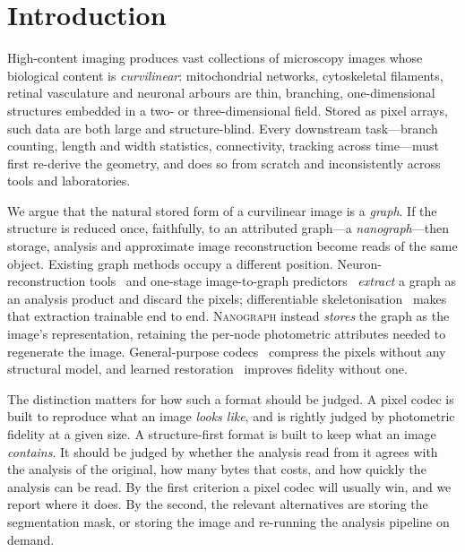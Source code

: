 \documentclass[10pt,a4paper]{article}
\newcommand{\method}{\textnormal{\textsc{Nanograph}}\xspace}
\begin{document}
\section{Introduction}
High-content imaging produces vast collections of microscopy images whose
biological content is \emph{curvilinear}: mitochondrial networks,
cytoskeletal filaments, retinal vasculature and neuronal arbours are thin,
branching, one-dimensional structures embedded in a two- or
three-dimensional field. Stored as pixel arrays, such data are both large
and structure-blind. Every downstream task---branch counting, length and
width statistics, connectivity, tracking across time---must first re-derive
the geometry, and does so from scratch and inconsistently across tools and
laboratories.

We argue that the natural stored form of a curvilinear image is a
\emph{graph}. If the structure is reduced once, faithfully, to an attributed
graph---a \emph{nanograph}---then storage, analysis and approximate image
reconstruction become reads of the same object. Existing graph methods
occupy a different position. Neuron-reconstruction tools~\cite{vaa3d,bigneuron}
and one-stage image-to-graph predictors~\cite{shit2022relationformer,prabhakar2023vesselformer,paetzold2021vesselgraph}
\emph{extract} a graph as an analysis product and discard the pixels;
differentiable skeletonisation~\cite{menten2023skeletonization} makes that
extraction trainable end to end. \method instead \emph{stores} the graph as
the image's representation, retaining the per-node photometric attributes
needed to regenerate the image. General-purpose codecs~\cite{jpeg,webp,skodras2001jpeg2000}
compress the pixels without any structural model, and learned
restoration~\cite{care} improves fidelity without one.

The distinction matters for how such a format should be judged. A pixel
codec is built to reproduce what an image \emph{looks like}, and is rightly
judged by photometric fidelity at a given size. A structure-first format is
built to keep what an image \emph{contains}. It should be judged by whether
the analysis read from it agrees with the analysis of the original, how many
bytes that costs, and how quickly the analysis can be read. By the first
criterion a pixel codec will usually win, and we report where it does. By
the second, the relevant alternatives are storing the segmentation mask, or
storing the image and re-running the analysis pipeline on demand.
\end{document}
